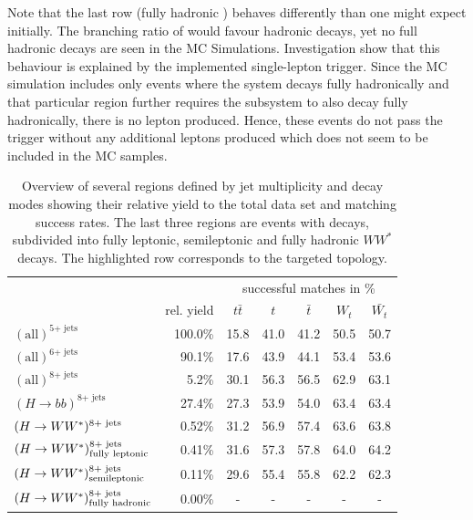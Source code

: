 \documentclass[bachelor,ngerman,english]{GAUBM}
\begin{document}
Note that the last row (fully hadronic \HWW) behaves differently than one might expect initially. The branching ratio of \wbosons would favour hadronic decays, yet no full hadronic decays are seen in the MC Simulations. Investigation show that this behaviour is explained by the implemented single-lepton trigger. Since the MC simulation includes only events where the \ttbar system decays fully hadronically and that particular region further requires the \HWW subsystem to also decay fully hadronically, there is no lepton produced. Hence, these events do not pass the trigger without any additional leptons produced which does not seem to be included in the MC samples. 

\begin{table}
    \centering
    \caption{Overview of several regions defined by jet multiplicity and decay modes showing their relative yield to the total data set and matching success rates. The last three regions are events with \HWW decays, subdivided into fully leptonic, semileptonic and fully hadronic $WW^*$ decays. The highlighted row corresponds to the targeted topology.}
    \begin{tabular}{l|r|c|c|c|c|c|}
        &&\multicolumn{5}{c|}{successful matches in \%}\\
        & rel. yield & $t\bar{t}$ & $t$ & $\bar{t}$ & $W_t$ & $\bar{W_t}$\\
        \hline
        $(\text{all})^{\text{5+ jets}}$  & 100.0\% & 15.8 & 41.0 & 41.2 & 50.5 & 50.7\\
        $(\text{all})^{\text{6+ jets}}$  & 90.1\% & 17.6 & 43.9 & 44.1 & 53.4 & 53.6\\
        $(\text{all})^{\text{8+ jets}}$  & 5.2\% & 30.1 & 56.3 & 56.5 & 62.9 & 63.1\\
        \hline
        $(H\rightarrow bb)^{\text{8+ jets}}$ & 27.4\% & 27.3 & 53.9 & 54.0 & 63.4 & 63.4\\
        $(\mbox{$H\rightarrow WW^*$})^{\text{8+ jets}}$ & 0.52\% & 31.2 & 56.9 & 57.4 & 63.6 & 63.8\\
        \hline
        $(\mbox{$H\rightarrow WW^*$})_{\text{fully leptonic}}^{\text{8+ jets}}$ & 0.41\% & 31.6 & 57.3 & 57.8 & 64.0 & 64.2\\
        \rowcolor{highlighter!40}
        $(\mbox{$H\rightarrow WW^*$})_{\text{semileptonic}}^{\text{8+ jets}}$ & 0.11\% & 29.6 & 55.4 & 55.8 & 62.2 & 62.3\\
        $(\mbox{$H\rightarrow WW^*$})_{\text{fully hadronic}}^{\text{8+ jets}}$ & 0.00\% & - & - & - & - & -\\
    \end{tabular}
    \label{tab:higgs_decay}
\end{table}
\end{document}

